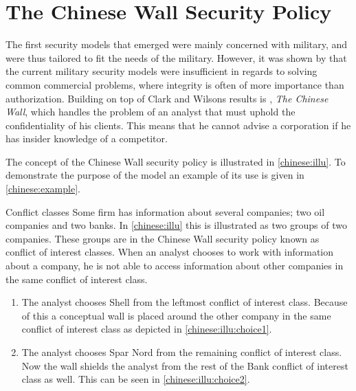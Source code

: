 \section{The Chinese Wall Security Policy}
The first security models that emerged were mainly concerned with military, and were thus tailored to fit the needs of the military.
However, it was shown by \citet{clarkwilson1987commercial} that the current military security models were insufficient in regards to solving common commercial problems, where integrity is often of more importance than authorization.
Building on top of Clark and Wilsons results is \citet{brewer1989chinese}, \emph{The Chinese Wall}, which handles the problem of an analyst that must uphold the confidentiality of his clients.
This means that he cannot advise a corporation if he has insider knowledge of a competitor.

The concept of the Chinese Wall security policy is illustrated in \cref{chinese:illu}.
To demonstrate the purpose of the model an example of its use is given in \cref{chinese:example}.

\begin{example}{Conflict classes}\label{chinese:example}
Some firm has information about several companies; two oil companies and two banks.
In \cref{chinese:illu} this is illustrated as two groups of two companies.
These groups are in the Chinese Wall security policy known as conflict of interest classes.
When an analyst chooses to work with information about a company, he is not able to access information about other companies in the same conflict of interest class.

\begin{enumerate}
    \item The analyst chooses Shell from the leftmost conflict of interest class.
    Because of this a conceptual wall is placed around the other company in the same conflict of interest class as depicted in \cref{chinese:illu:choice1}.
    \item The analyst chooses Spar Nord from the remaining conflict of interest class.
    Now the wall shields the analyst from the rest of the Bank conflict of interest class as well.
    This can be seen in \cref{chinese:illu:choice2}.
\end{enumerate}
\end{example}

